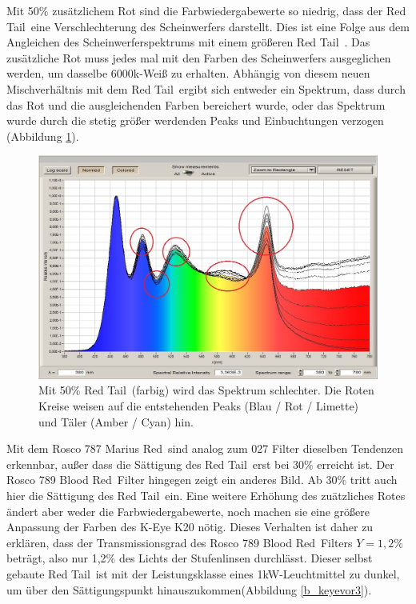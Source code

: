 Mit 50\% zusätzlichem Rot sind die Farbwiedergabewerte so niedrig, dass der \glqq Red Tail\grqq\ eine Verschlechterung des Scheinwerfers darstellt. Dies ist eine Folge aus dem Angleichen des Scheinwerferspektrums mit einem größeren \glqq Red Tail\grqq\ .
Das zusätzliche Rot muss jedes mal mit den Farben des Scheinwerfers ausgeglichen werden, um dasselbe 6000k-Weiß zu erhalten. Abhängig von diesem neuen Mischverhältnis mit dem \glqq Red Tail\grqq\ ergibt sich entweder ein Spektrum, dass durch das Rot und die ausgleichenden Farben bereichert wurde, oder das Spektrum wurde durch die stetig größer werdenden Peaks und Einbuchtungen verzogen (Abbildung \ref{b_keyevor2}).


\begin{figure}[H]     %
\centering
\includegraphics[width=1.0\textwidth]{bilder/keyevor2} 
\caption {Mit 50\% \glqq Red Tail\grqq\ (farbig) wird das Spektrum schlechter. Die Roten Kreise weisen auf die entstehenden Peaks (Blau / Rot / Limette) und Täler (Amber / Cyan) hin.}\label{b_keyevor2}
\end{figure}


Mit dem Rosco 787 \glqq Marius Red\grqq\ sind analog zum 027 Filter dieselben Tendenzen erkennbar, außer dass die Sättigung des \glqq Red Tail\grqq\ erst bei 30\% erreicht ist.
Der Rosco 789 \glqq Blood Red\grqq\ Filter hingegen zeigt ein anderes Bild. Ab 30\% tritt auch hier die Sättigung des \glqq Red Tail\grqq\ ein. Eine weitere Erhöhung des zuätzliches Rotes ändert aber weder die Farbwiedergabewerte, noch machen sie eine größere Anpassung der Farben des K-Eye K20 nötig. Dieses Verhalten ist daher zu erklären, dass der Transmissionsgrad des Rosco 789 \glqq Blood Red\grqq\ Filters  $Y=1,2\%$ beträgt, also nur 1,2\% des Lichts der Stufenlinsen durchlässt. Dieser selbst gebaute \glqq Red Tail\grqq\ ist mit der Leistungsklasse eines 1kW-Leuchtmittel zu dunkel, um über den Sättigungspunkt hinauszukommen(Abbildung \ref{b_keyevor3}).  

